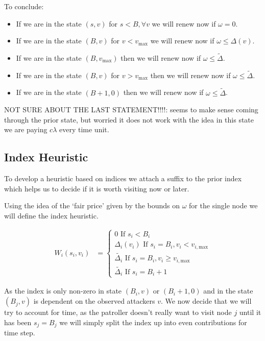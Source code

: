 \documentclass[a4paper,10pt]{article}
\theoremstyle{definition}
\theoremstyle{definition}
\theoremstyle{remark}
\theoremstyle{definition}
\begin{document}
To conclude:
\begin{itemize}
\item If we are in the state $(s,v)$ for $s < B , \forall v$ we will renew now if $\omega=0$.
\item If we are in the state $(B,v)$ for $v < v_{\text{max}}$ we will renew now if $\omega \leq \Delta(v)$.
\item If we are in the state $(B,v_{\text{max}})$ then we will renew now if $\omega \leq \widetilde{\Delta}$.
\item If we are in the state $(B,v)$ for $v > v_{\text{max}}$ then we will renew now if $\omega \leq \widetilde{\Delta}$.
\item If we are in the state $(B+1,0)$ then we will renew now if $\omega \leq \widetilde{\Delta}$.
\end{itemize}

NOT SURE ABOUT THE LAST STATEMENT!!!!: seems to make sense coming through the prior state, but worried it does not work with the idea in this state we are paying $c \lambda$ every time unit.


\subsection{Index Heuristic}
To develop a heuristic based on indices we attach a suffix to the prior index which helps us to decide if it is worth visiting now or later.

Using the idea of the `fair price' given by the bounds on $\omega$ for the single node we will define the index heuristic.

\begin{align}
W_{i}(s_{i},v_{i})&=\begin{cases}
0 \text{ If } s_{i}<B_{i} \\
\Delta_{i}(v_{i}) \text{ If } s_{i}=B_{i} , v_{i}<v_{i,\text{max}} \\
\widetilde{\Delta_{i}} \text{ If } s_{i}=B_{i} , v_{i} \geq v_{i,\text{max}} \\
\widetilde{\Delta_{i}} \text{ If } s_{i}=B_{i}+1
\end{cases}
\end{align}

As the index is only non-zero in state $(B_{i},v)$ or $(B_{i}+1,0)$ and in the state $(B_{j},v)$ is dependent on the observed attackers $v$. We now decide that we will try to account for time, as the patroller doesn't really want to visit node $j$ until it has been $s_{j}=B_{j}$ we will simply split the index up into even contributions for time step.
\end{document}
